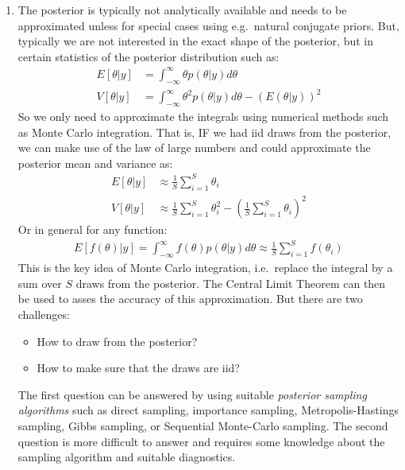 \begin{enumerate}
\item The posterior is typically not analytically available and needs to be approximated
  unless for special cases using e.g.\ natural conjugate priors.
But, typically we are not interested in the exact shape of the posterior,
  but in certain statistics of the posterior distribution such as:
\begin{align*}
E[\theta|y] &= \int_{-\infty}^{\infty} \theta p(\theta|y) d\theta
\\
V[\theta|y] &= \int_{-\infty}^{\infty} \theta^2 p(\theta|y) d\theta - (E(\theta|y))^2
\end{align*}
So we only need to approximate the integrals using numerical methods such as Monte Carlo integration.
That is, IF we had iid draws from the posterior, we can make use of the law of large numbers
  and could approximate the posterior mean and variance as:
\begin{align*}
E[\theta|y] &\approx \frac{1}{S} \sum_{i=1}^S \theta_i
\\
V[\theta|y] &\approx \frac{1}{S} \sum_{i=1}^S \theta_i^2 - {\left(\frac{1}{S} \sum_{i=1}^S \theta_i\right)}^2
\end{align*}
Or in general for any function:
\begin{align*}
E[f(\theta)|y] = \int_{-\infty}^{\infty} f(\theta) p(\theta|y) d\theta \approx \frac{1}{S} \sum_{i=1}^S f(\theta_i)
\end{align*}
This is the key idea of Monte Carlo integration,
  i.e.\ replace the integral by a sum over \(S\) draws from the posterior.
The Central Limit Theorem can then be used to asses the accuracy of this approximation.
But there are two challenges:
\begin{itemize}
\item How to draw from the posterior?
\item How to make sure that the draws are iid?
\end{itemize}
The first question can be answered by using suitable \emph{posterior sampling algorithms}
  such as direct sampling, importance sampling, Metropolis-Hastings sampling, Gibbs sampling, or  Sequential Monte-Carlo sampling.
The second question is more difficult to answer and requires some knowledge about the sampling algorithm and suitable diagnostics.
\end{enumerate}